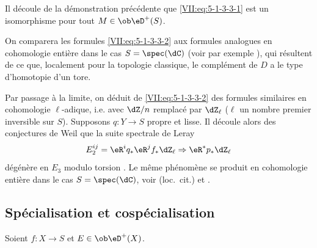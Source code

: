 Il découle de la démonstration précédente que \eqref{VII:eq:5-1-3-3-1} 
est un isomorphisme pour tout $M\in\ob\eD^+(S)$. 

On comparera les formules \eqref{VII:eq:5-1-3-3-2} aux formules analogues en 
cohomologie entière dans le \mbox{cas} $S=\spec(\dC)$ (voir par exemple 
\cite[3.1]{de71-2}), qui résultent de ce que, localement pour la topologie 
classique, le complément de $D$ a le type d'homotopie d'un tore. 

Par passage à la limite, on déduit de \eqref{VII:eq:5-1-3-3-2} des formules 
similaires en cohomologie $\ell$-adique, i.e. avec $\dZ/n$ remplacé par 
$\dZ_\ell$ ($\ell$ un nombre premier inversible sur $S$). Supposons 
$q:Y\to S$ propre et lisse. Il découle alors des conjectures de Weil 
\cite{de74,de80} que la suite spectrale de Leray 
\[
  E_2^{i j} = \eR^i q_\ast \eR^j f_\ast \dZ_\ell \Rightarrow \eR^\ast p_\ast \dZ_\ell 
\]
dégénère en $E_3$ modulo torsion \cite[\S 6]{de71-1}. Le même 
phénomène se produit en cohomologie entière dans le cas 
$S=\spec(\dC)$, voir (loc.\ cit.) et \cite[3.2.13]{de71-2}. 





\subsection{Spécialisation et cospécialisation}\label{VII:5-2}

Soient $f:X\to S$ et $E\in\ob\eD^+(X)$. 





\subsubsection{}\label{VII:5-2-1}

